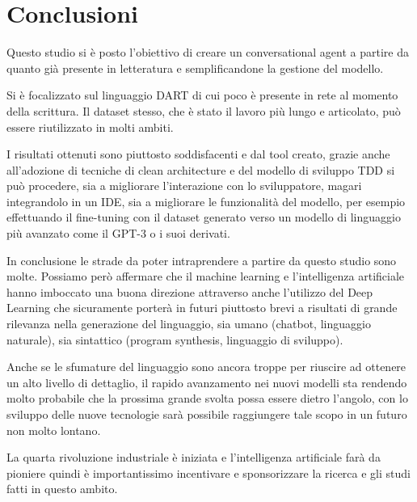 \chapter{Conclusioni} %
%


\begin{citazione}
	Questo studio si è posto l'obiettivo di creare un conversational agent a partire da quanto già presente in letteratura e semplificandone la gestione del modello.
	
	Si è focalizzato sul linguaggio DART di cui poco è presente in rete al momento della scrittura. Il dataset stesso, che è stato il lavoro più lungo e articolato, può essere riutilizzato in molti ambiti. 
	
	I risultati ottenuti sono piuttosto soddisfacenti e dal tool creato, grazie anche all'adozione di tecniche di clean architecture e del modello di sviluppo TDD si può procedere, sia a migliorare l'interazione con lo sviluppatore, magari integrandolo in un IDE, sia a migliorare le funzionalità del modello, per esempio effettuando il fine-tuning con il dataset generato verso un modello di linguaggio più avanzato come il GPT-3 o i suoi derivati.
	
	In conclusione le strade da poter intraprendere a partire da questo studio sono molte. Possiamo però affermare che il machine learning e l'intelligenza artificiale hanno imboccato una buona direzione attraverso anche l'utilizzo del Deep Learning che sicuramente porterà in futuri piuttosto brevi a risultati di grande rilevanza nella generazione del linguaggio, sia umano (chatbot, linguaggio naturale), sia sintattico (program synthesis, linguaggio di sviluppo). 
	
	Anche se le sfumature del linguaggio sono ancora troppe per riuscire ad ottenere un  alto livello di dettaglio, il rapido avanzamento nei nuovi modelli sta rendendo molto probabile che la prossima grande svolta possa essere dietro l'angolo, con lo sviluppo delle nuove tecnologie sarà possibile raggiungere tale scopo in un futuro non molto lontano.
	
	La quarta rivoluzione industriale è iniziata e l'intelligenza artificiale farà da pioniere quindi è importantissimo incentivare e sponsorizzare la ricerca e gli studi fatti in questo ambito.

\end{citazione}

\newpage
